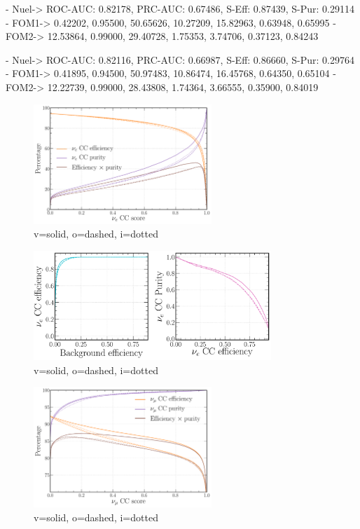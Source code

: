 - Nuel-> ROC-AUC: 0.82178, PRC-AUC: 0.67486, S-Eff: 0.87439, S-Pur: 0.29114
- FOM1-> 0.42202, 0.95500, 50.65626, 10.27209, 15.82963, 0.63948, 0.65995
- FOM2-> 12.53864, 0.99000, 29.40728, 1.75353, 3.74706, 0.37123, 0.84243

- Nuel-> ROC-AUC: 0.82116, PRC-AUC: 0.66987, S-Eff: 0.86660, S-Pur: 0.29764
- FOM1-> 0.41895, 0.94500, 50.97483, 10.86474, 16.45768, 0.64350, 0.65104
- FOM2-> 12.22739, 0.99000, 28.43808, 1.74364, 3.66555, 0.35900, 0.84019

\begin{figure} %
    \includegraphics[width=0.6\textwidth]{diagrams/6-cvn/chipsnet/repr_nuel_eff_curves.pdf}
    \caption[repr nuel eff curves short]
    {v=solid, o=dashed, i=dotted}
    \label{fig:repr_nuel_eff_curves}
\end{figure}

\begin{figure} %
    \includegraphics[width=0.8\textwidth]{diagrams/6-cvn/chipsnet/repr_nuel_comp_curves.pdf}
    \caption[repr nuel comp curves short]
    {v=solid, o=dashed, i=dotted}
    \label{fig:repr_nuel_comp_curves}
\end{figure}

\begin{figure} %
    \includegraphics[width=0.6\textwidth]{diagrams/6-cvn/chipsnet/repr_numu_eff_curves.pdf}
    \caption[repr numu eff curves short]
    {v=solid, o=dashed, i=dotted}
    \label{fig:repr_numu_eff_curves}
\end{figure}

